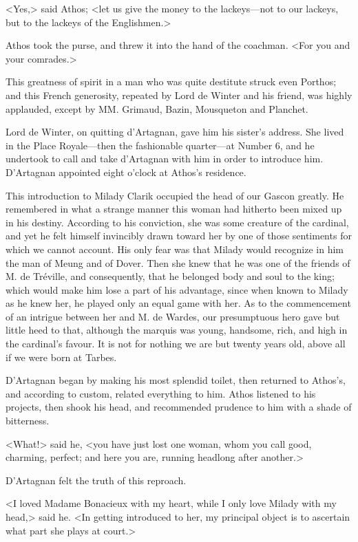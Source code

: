 <Yes,> said Athos; <let us give the money to the lackeys---not to our lackeys, but to the lackeys of the Englishmen.> 

Athos took the purse, and threw it into the hand of the coachman. <For you and your comrades.> 

This greatness of spirit in a man who was quite destitute struck even Porthos; and this French generosity, repeated by Lord de Winter and his friend, was highly applauded, except by MM. Grimaud, Bazin, Mousqueton and Planchet. 

Lord de Winter, on quitting d'Artagnan, gave him his sister's address. She lived in the Place Royale---then the fashionable quarter---at Number 6, and he undertook to call and take d'Artagnan with him in order to introduce him. D'Artagnan appointed eight o'clock at Athos's residence. 

This introduction to Milady Clarik occupied the head of our Gascon greatly. He remembered in what a strange manner this woman had hitherto been mixed up in his destiny. According to his conviction, she was some creature of the cardinal, and yet he felt himself invincibly drawn toward her by one of those sentiments for which we cannot account. His only fear was that Milady would recognize in him the man of Meung and of Dover. Then she knew that he was one of the friends of M. de Tréville, and consequently, that he belonged body and soul to the king; which would make him lose a part of his advantage, since when known to Milady as he knew her, he played only an equal game with her. As to the commencement of an intrigue between her and M. de Wardes, our presumptuous hero gave but little heed to that, although the marquis was young, handsome, rich, and high in the cardinal's favour. It is not for nothing we are but twenty years old, above all if we were born at Tarbes. 

D'Artagnan began by making his most splendid toilet, then returned to Athos's, and according to custom, related everything to him. Athos listened to his projects, then shook his head, and recommended prudence to him with a shade of bitterness. 

<What!> said he, <you have just lost one woman, whom you call good, charming, perfect; and here you are, running headlong after another.> 

D'Artagnan felt the truth of this reproach. 

<I loved Madame Bonacieux with my heart, while I only love Milady with my head,> said he. <In getting introduced to her, my principal object is to ascertain what part she plays at court.> 


